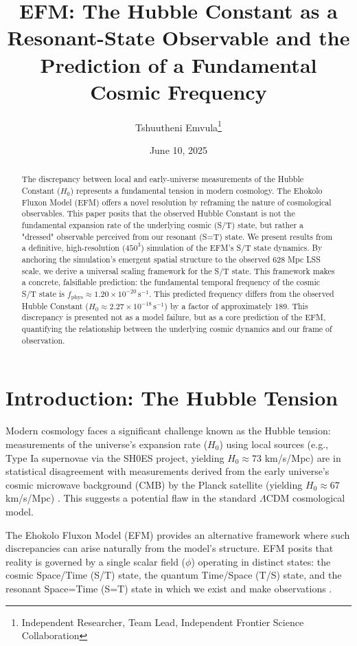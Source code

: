 \documentclass[11pt]{article}
\title{EFM: The Hubble Constant as a Resonant-State Observable and the Prediction of a Fundamental Cosmic Frequency}
\author{Tshuutheni Emvula\thanks{Independent Researcher, Team Lead, Independent Frontier Science Collaboration}}
\date{June 10, 2025}
\begin{document}
\maketitle

\begin{abstract}
The discrepancy between local and early-universe measurements of the Hubble Constant ($H_0$) represents a fundamental tension in modern cosmology. The Ehokolo Fluxon Model (EFM) offers a novel resolution by reframing the nature of cosmological observables. This paper posits that the observed Hubble Constant is not the fundamental expansion rate of the underlying cosmic (S/T) state, but rather a "dressed" observable perceived from our resonant (S=T) state. We present results from a definitive, high-resolution ($450^3$) simulation of the EFM's S/T state dynamics. By anchoring the simulation's emergent spatial structure to the observed 628 Mpc LSS scale, we derive a universal scaling framework for the S/T state. This framework makes a concrete, falsifiable prediction: the fundamental temporal frequency of the cosmic S/T state is \(f_{\text{phys}} \approx 1.20 \times 10^{-20} \, \text{s}^{-1}\). This predicted frequency differs from the observed Hubble Constant (\(H_0 \approx 2.27 \times 10^{-18} \, \text{s}^{-1}\)) by a factor of approximately 189. This discrepancy is presented not as a model failure, but as a core prediction of the EFM, quantifying the relationship between the underlying cosmic dynamics and our frame of observation.
\end{abstract}

\section{Introduction: The Hubble Tension}
Modern cosmology faces a significant challenge known as the Hubble tension: measurements of the universe's expansion rate ($H_0$) using local sources (e.g., Type Ia supernovae via the SH0ES project, yielding \(H_0 \approx 73\) km/s/Mpc) are in statistical disagreement with measurements derived from the early universe's cosmic microwave background (CMB) by the Planck satellite (yielding \(H_0 \approx 67\) km/s/Mpc) \citep{riess2022, planck2018}. This suggests a potential flaw in the standard \(\Lambda\)CDM cosmological model.

The Ehokolo Fluxon Model (EFM) provides an alternative framework where such discrepancies can arise naturally from the model's structure. EFM posits that reality is governed by a single scalar field (\(\phi\)) operating in distinct states: the cosmic Space/Time (S/T) state, the quantum Time/Space (T/S) state, and the resonant Space=Time (S=T) state in which we exist and make observations \citep{emvula2025compendium_intro}.
\end{document}
